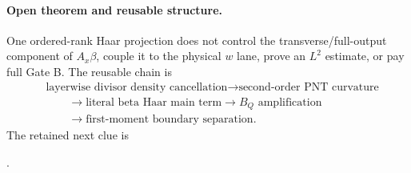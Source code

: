\documentclass[10pt]{article}
\newcommand{\Ax}{A_x}
\begin{document}
\paragraph{Open theorem and reusable structure.}
One ordered-rank Haar projection does not control the transverse/full-output
component of $\Ax\beta$, couple it to the physical $w$ lane, prove an $L^2$
estimate, or pay full Gate B.  The reusable chain is
\begin{align*}
 &\text{layerwise divisor density cancellation}
 \longrightarrow \text{second-order PNT curvature}\\
 &\qquad\longrightarrow \text{literal beta Haar main term}
 \longrightarrow B_Q\text{ amplification}\\
 &\qquad\longrightarrow \text{first-moment boundary separation}.
\end{align*}
The retained next clue is
\begin{center}
\small{}.
\end{center}



\end{document}
